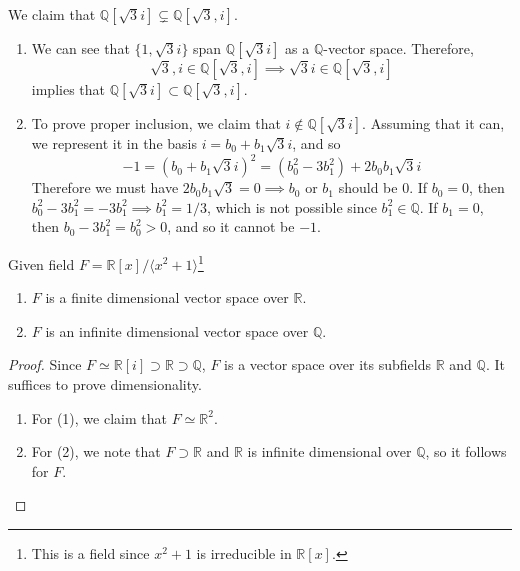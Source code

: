   \begin{example}
    We claim that $\mathbb{Q}[\sqrt{3} i] \subsetneq \mathbb{Q}[\sqrt{3}, i]$. 
    \begin{enumerate}
      \item We can see that $\{1, \sqrt{3}i \}$ span $\mathbb{Q}[\sqrt{3}i ]$ as a $\mathbb{Q}$-vector space. Therefore, 
      \begin{equation}
        \sqrt{3}, i \in \mathbb{Q}[\sqrt{3}, i] \implies \sqrt{3} i \in \mathbb{Q}[\sqrt{3}, i]
      \end{equation} 
      implies that $\mathbb{Q}[\sqrt{3} i] \subset \mathbb{Q}[\sqrt{3}, i]$. 

      \item To prove proper inclusion, we claim that $i \not\in \mathbb{Q}[\sqrt{3}i]$. Assuming that it can, we represent it in the basis $i = b_0 + b_1 \sqrt{3} i$, and so
      \begin{equation}
        -1 = (b_0 + b_1 \sqrt{3} i)^2 = (b_0^2 - 3b_1^2) + 2b_0 b_1 \sqrt{3} i
      \end{equation}
      Therefore we must have $2b_0 b_1 \sqrt{3} = 0 \implies b_0$ or $b_1$ should be $0$. If $b_0 = 0$, then $b_0^2 - 3b_1^2 = -3 b_1^2 \implies b_1^2 = 1/3$, which is not possible since $b_1^2 \in \mathbb{Q}$. If $b_1 = 0$, then $b_0 - 3 b_1^2 = b_0^2 > 0$, and so it cannot be $-1$. 
    \end{enumerate}
  \end{example}

  \begin{theorem}
    Given field $F = \mathbb{R}[x]/\langle x^2 + 1 \rangle$\footnote{This is a field since $x^2 + 1$ is irreducible in $\mathbb{R}[x]$. }
    \begin{enumerate}
      \item $F$ is a finite dimensional vector space over $\mathbb{R}$. 
      \item $F$ is an infinite dimensional vector space over $\mathbb{Q}$. 
    \end{enumerate}
  \end{theorem}
  \begin{proof} 
    Since $F \simeq \mathbb{R}[i] \supset \mathbb{R} \supset \mathbb{Q}$, $F$ is a vector space over its subfields $\mathbb{R}$ and $\mathbb{Q}$. It suffices to prove dimensionality. 
    \begin{enumerate}
      \item For (1), we claim that $F \simeq \mathbb{R}^2$. 
      \item For (2), we note that $F \supset \mathbb{R}$ and $\mathbb{R}$ is infinite dimensional over $\mathbb{Q}$, so it follows for $F$. 
    \end{enumerate}
  \end{proof}


